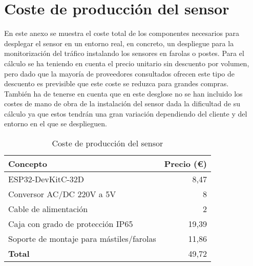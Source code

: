 \documentclass[../proyecto.tex]{subfiles}
\begin{document}
\chapter{Coste de producción del sensor}\label{chap:coste_sensor}

En este anexo se muestra el coste total de los componentes necesarios para desplegar el sensor en un entorno real, en concreto, un despliegue para la monitorización del tráfico instalando los sensores en farolas o postes. Para el cálculo se ha teniendo en cuenta el precio unitario sin descuento por volumen, pero dado que la mayoría de proveedores consultados ofrecen este tipo de descuento es previsible que este coste se reduzca para grandes compras.\\

También ha de tenerse en cuenta que en este desglose no se han incluido los costes de mano de obra de la instalación del sensor dada la dificultad de su cálculo ya que estos tendrán una gran variación dependiendo del cliente y del entorno en el que se desplieguen.\\


\begin{table}[H]
\centering
\begin{tabular}{ |l|r| }
\hline
\textbf{Concepto} & \textbf{Precio (€)} \\
\hline\hline
ESP32-DevKitC-32D  & 8,47  \\ \hline
Conversor AC/DC 220V a 5V & 8 \\ \hline
Cable de alimentación & 2 \\ \hline
Caja con grado de protección IP65  & 19,39  \\ \hline
Soporte de montaje para mástiles/farolas & 11,86 \\ \hline
\textbf{Total} & 49,72\\ \hline
\end{tabular}
\caption{Coste de producción del sensor}
\label{table:coste_producción_sensor}
\end{table}

\end{document}
